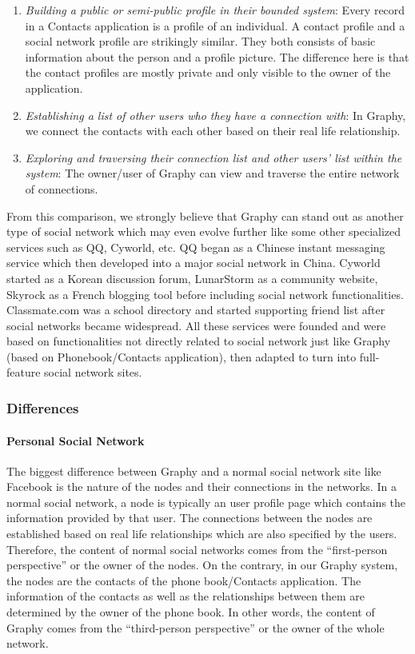 \begin{enumerate}
    \item \textit{Building a public or semi-public profile in their bounded system}: Every record in a Contacts application is a profile of an individual. A contact profile and a social network profile are strikingly similar. They both consists of basic information about the person and a profile picture. The difference here is that the contact profiles are mostly private and only visible to the owner of the application.
    \item \textit{Establishing a list of other users who they have a connection with}: In Graphy, we connect the contacts with each other based on their real life relationship.
    \item \textit{Exploring and traversing their connection list and other users' list within the system}: The owner/user of Graphy can view and traverse the entire network of connections.
\end{enumerate}

From this comparison, we strongly believe that Graphy can stand out as another type of social network which may even evolve further like some other specialized services such as QQ, Cyworld, etc. QQ began as a Chinese instant messaging service which then developed into a major social network in China. Cyworld started as a Korean discussion forum, LunarStorm as a community website, Skyrock as a French blogging tool before including social network functionalities. Classmate.com was a school directory and started supporting friend list after social networks became widespread. All these services were founded and were based on functionalities not directly related to social network just like Graphy (based on Phonebook/Contacts application), then adapted to turn into full-feature social network sites.

\subsubsection{Differences}

\paragraph{Personal Social Network}
The biggest difference between Graphy and a normal social network site like Facebook is the nature of the nodes and their connections in the networks. In a normal social network, a node is typically an user profile page which contains the information provided by that user. The connections between the nodes are established based on real life relationships which are also specified by the users. Therefore, the content of normal social networks comes from the ``first-person perspective'' or the owner of the nodes. On the contrary, in our Graphy system, the nodes are the contacts of the phone book/Contacts application. The information of the contacts as well as the relationships between them are determined by the owner of the phone book. In other words, the content of Graphy comes from the ``third-person perspective'' or the owner of the whole network.

